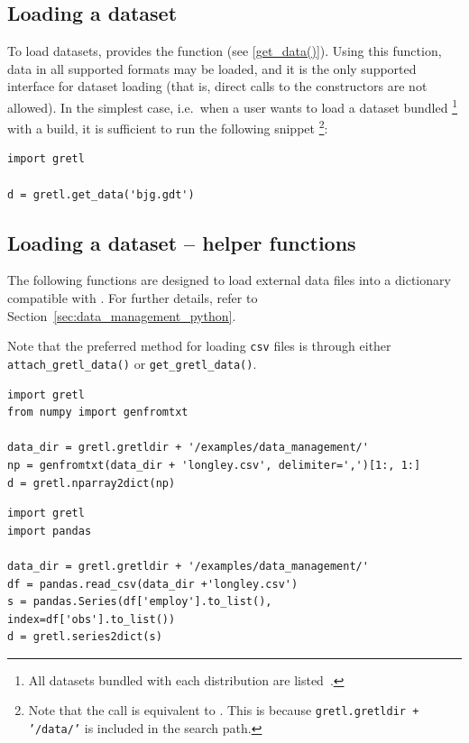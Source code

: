 \subsection{Loading a dataset}
To load datasets, \gretlpy provides the 
function (see \ref{get_data()}). Using this function, data in all
supported formats may be loaded, and it is the only supported
interface for dataset loading (that is, direct calls to the
\classpydataset constructors are not allowed). In the simplest
case, i.e.\ when a user wants to load a dataset bundled%
\footnote{All datasets bundled with each \gretlpy distribution
	are listed~.}
with a \gretlpy build, it is sufficient to run the following snippet%
\footnote{Note that the call 
	is equivalent to
	.
	This is because \texttt{gretl.gretldir + '/data/'} is included
	in the \lgretl search path.}:
\begin{lstlisting}[style=pythonstylefoot]
import gretl

d = gretl.get_data('bjg.gdt')
\end{lstlisting}


\subsection{Loading a dataset -- helper functions}
The following functions are designed to load external
data files into a dictionary compatible with \gretlpy.
For further details, refer to Section~\ref{sec:data_management_python}.

\noindent Note that the preferred method for loading \texttt{csv}
files is through either \texttt{attach\_gretl\_data()}
or \texttt{get\_gretl\_data()}.

\begin{lstlisting}[style=pythonstylefoot]
import gretl
from numpy import genfromtxt

data_dir = gretl.gretldir + '/examples/data_management/'
np = genfromtxt(data_dir + 'longley.csv', delimiter=',')[1:, 1:]
d = gretl.nparray2dict(np)
\end{lstlisting}

\begin{lstlisting}[style=pythonstylefoot]
import gretl
import pandas

data_dir = gretl.gretldir + '/examples/data_management/'
df = pandas.read_csv(data_dir +'longley.csv')
s = pandas.Series(df['employ'].to_list(),
index=df['obs'].to_list())
d = gretl.series2dict(s)
\end{lstlisting}


